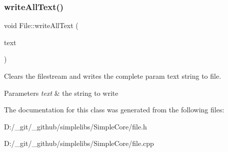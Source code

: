 \subsubsection{\texorpdfstring{writeAllText()}{writeAllText()}}
{\footnotesize\ttfamily void File\+::write\+All\+Text (\begin{DoxyParamCaption}\item[{const \mbox{\hyperlink{class_a_string}{A\+String}} \&}]{text }\end{DoxyParamCaption})}



Clears the filestream and writes the complete param text string to file. 


\begin{DoxyParams}{Parameters}
{\em text} & the string to write \\
\hline
\end{DoxyParams}


The documentation for this class was generated from the following files\+:\begin{DoxyCompactItemize}
\item 
D\+:/\+\_\+git/\+\_\+github/simplelibs/\+Simple\+Core/file.\+h\item 
D\+:/\+\_\+git/\+\_\+github/simplelibs/\+Simple\+Core/file.\+cpp\end{DoxyCompactItemize}
